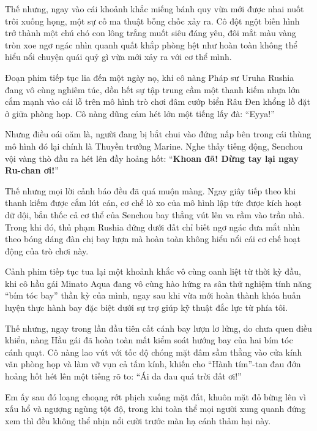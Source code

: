 \documentclass[../main.tex]{subfiles}
\begin{document}
Thế nhưng, ngay vào cái khoảnh khắc miếng bánh quy vừa mới được nhai nuốt trôi xuống họng, một sự cố ma thuật bỗng chốc xảy ra. Cô đột ngột biến hình trở thành một chú chó con lông trắng muốt siêu đáng yêu, đôi mắt màu vàng tròn xoe ngơ ngác nhìn quanh quất khắp phòng hệt như hoàn toàn không thể hiểu nổi chuyện quái quỷ gì vừa mới xảy ra với cơ thể mình.


\il


Đoạn phim tiếp tục lia đến một ngày nọ, khi cô nàng Pháp sư Uruha Rushia đang vô cùng nghiêm túc, dồn hết sự tập trung cầm một thanh kiếm nhựa lớn cắm mạnh vào cái lỗ trên mô hình trò chơi đâm cướp biển Râu Đen khổng lồ đặt ở giữa phòng họp. Cô nàng dũng cảm hét lớn một tiếng lấy đà: ``Eyya!''

Nhưng điều oái oăm là, người đang bị bắt chui vào đứng nấp bên trong cái thùng mô hình đó lại chính là Thuyền trưởng Marine. Nghe thấy tiếng động, Senchou vội vàng thò đầu ra hét lên đầy hoảng hốt: ``\textbf{Khoan đã! Dừng tay lại ngay Ru-chan ơi!}''

Thế nhưng mọi lời cảnh báo đều đã quá muộn màng. Ngay giây tiếp theo khi thanh kiếm được cắm lút cán, cơ chế lò xo của mô hình lập tức được kích hoạt dữ dội, bắn thốc cả cơ thể của Senchou bay thẳng vút lên va rầm vào trần nhà. Trong khi đó, thủ phạm Rushia đứng dưới đất chỉ biết ngơ ngác đưa mắt nhìn theo bóng dáng đàn chị bay lượn mà hoàn toàn không hiểu nổi cái cơ chế hoạt động của trò chơi này.


\il


Cảnh phim tiếp tục tua lại một khoảnh khắc vô cùng oanh liệt từ thời kỳ đầu, khi cô hầu gái Minato Aqua đang vô cùng hào hứng ra sân thử nghiệm tính năng ``bím tóc bay'' thần kỳ của mình, ngay sau khi vừa mới hoàn thành khóa huấn luyện thực hành bay đặc biệt dưới sự trợ giúp kỹ thuật đắc lực từ phía tôi.

Thế nhưng, ngay trong lần đầu tiên cất cánh bay lượn lơ lửng, do chưa quen điều khiển, nàng Hầu gái đã hoàn toàn mất kiểm soát hướng bay của hai bím tóc cánh quạt. Cô nàng lao vút với tốc độ chóng mặt đâm sầm thẳng vào cửa kính văn phòng họp và làm vỡ vụn cả tấm kính, khiến cho ``Hành tím''-tan đau đớn hoảng hốt hét lên một tiếng rõ to: ``Ái da đau quá trời đất ơi!''

Em ấy sau đó loạng choạng rớt phịch xuống mặt đất, khuôn mặt đỏ bừng lên vì xấu hổ và ngượng ngùng tột độ, trong khi toàn thể mọi người xung quanh đứng xem thì đều không thể nhịn nổi cười trước màn hạ cánh thảm hại này.
\end{document}
